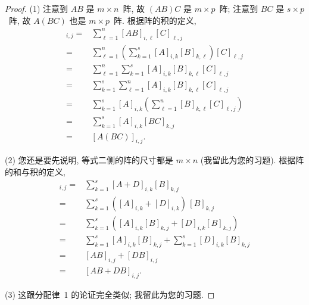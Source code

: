 \begin{proof}
    (1)
    注意到 \(AB\) 是 \(m \times n\)~阵,
    故 \((AB)C\) 是 \(m \times p\)~阵;
    注意到 \(BC\) 是 \(s \times p\)~阵,
    故 \(A(BC)\) 也是 \(m \times p\)~阵.
    根据阵的积的定义,
    \begin{align*}
        [(AB)C]_{i,j}
        = {} &
        \sum_{\ell = 1}^{n} {[AB]_{i,\ell} [C]_{\ell,j}}
        \\
        = {} &
        \sum_{\ell = 1}^{n} {
        \left(\sum_{k = 1}^{s} {[A]_{i,k} [B]_{k,\ell}} \right)
        [C]_{\ell,j} }
        \\
        = {} &
        \sum_{\ell = 1}^{n} {
        \sum_{k = 1}^{s} {
        [A]_{i,k} [B]_{k,\ell} [C]_{\ell,j} }}
        \\
        = {} &
        \sum_{k = 1}^{s} {
        \sum_{\ell = 1}^{n} {
        [A]_{i,k} [B]_{k,\ell} [C]_{\ell,j}}}
        \\
        = {} &
        \sum_{k = 1}^{s} {
        [A]_{i,k}
        \left(
        \sum_{\ell = 1}^{n} {[B]_{k,\ell} [C]_{\ell,j}}
        \right) }
        \\
        = {} &
        \sum_{k = 1}^{s} {[A]_{i,k} [BC]_{k,j}}
        \\
        = {} &
        [A(BC)]_{i,j}.
    \end{align*}

    (2)
    您还是要先说明, 等式二侧的阵的尺寸都是 \(m \times n\)
    (我留此为您的习题).
    根据阵的和与积的定义,
    \begin{align*}
        [(A + D)B]_{i,j}
        = {} &
        \sum_{k = 1}^{s} {[A + D]_{i,k} [B]_{k,j}}
        \\
        = {} &
        \sum_{k = 1}^{s} {([A]_{i,k} + [D]_{i,k})\, [B]_{k,j}}
        \\
        = {} &
        \sum_{k = 1}^{s} {([A]_{i,k} [B]_{k,j}
        + [D]_{i,k} [B]_{k,j})}
        \\
        = {} &
        \sum_{k = 1}^{s} {[A]_{i,k} [B]_{k,j}}
        +
        \sum_{k = 1}^{s} {[D]_{i,k} [B]_{k,j}}
        \\
        = {} &
        [AB]_{i,j} + [DB]_{i,j}
        \\
        = {} &
        [AB + DB]_{i,j}.
    \end{align*}

    (3)
    这跟分配律~1 的论证完全类似;
    我留此为您的习题.


\end{proof}
